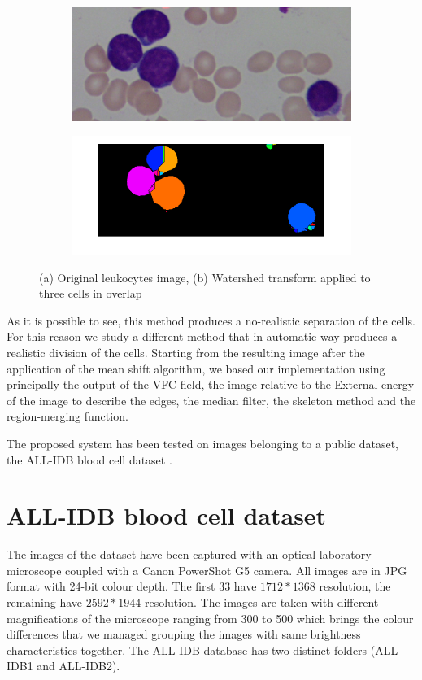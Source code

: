 \begin{figure}
	\centering
	\begin{subfigure}[b]{0.5\textwidth}
        \includegraphics[width=\textwidth]{img/Im007_1_crop.png}
        \caption{ }
        \label{fig:origimage}
    \end{subfigure}
    \begin{subfigure}[b]{0.5\textwidth}
		\includegraphics[width=\textwidth]{img/waterTrRes.png}
		\caption{ }
		\label{fig:watershedoncells}
	\end{subfigure}
	\caption{(a) Original leukocytes image, (b) Watershed transform applied to three cells in overlap}
	\label{fig:exOnImage7}
\end{figure}
As it is possible to see, this method produces a no-realistic separation of the cells. For this reason we study a different method that in automatic way produces a realistic division of the cells. Starting from the resulting image after the application of the mean shift algorithm, we based our implementation using principally the output of the VFC field, the image relative to the External energy of the image to describe the edges, the median filter, the skeleton method and the region-merging function.

\bigskip
The proposed system has been tested on images belonging to a public dataset, the ALL-IDB blood cell dataset \cite{idbpaper}.

\section{ALL-IDB blood cell dataset}
The images of the dataset have been captured with an optical laboratory microscope coupled with
a Canon PowerShot G5 camera. All images are in JPG format with 24-bit colour depth. The first 33
have $1712*1368$ resolution, the remaining have $2592*1944$ resolution. The images are taken with
different magnifications of the microscope ranging from 300 to 500 which brings the colour
differences that we managed grouping the images with same brightness characteristics together. The
ALL-IDB database has two distinct folders (ALL-IDB1 and ALL-IDB2).

